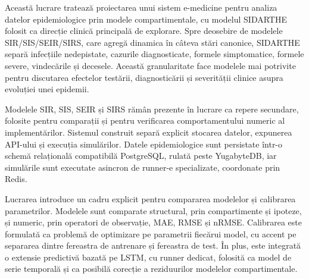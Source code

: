 
Această lucrare tratează proiectarea unui sistem e-medicine pentru analiza datelor
epidemiologice prin modele compartimentale, cu modelul SIDARTHE folosit ca
direcție clinică principală de explorare. Spre deosebire de modelele
SIR/SIS/SEIR/SIRS, care agregă dinamica în câteva stări canonice, SIDARTHE separă
infecțiile nedepistate, cazurile diagnosticate, formele simptomatice, formele
severe, vindecările și decesele.
Această granularitate face modelele mai potrivite pentru discutarea efectelor
testării, diagnosticării și severității clinice asupra evoluției unei epidemii.

Modelele SIR, SIS, SEIR și SIRS rămân prezente în lucrare ca repere
secundare, folosite pentru comparații și pentru verificarea comportamentului
numeric al implementărilor. Sistemul construit separă explicit stocarea datelor,
expunerea API-ului și execuția simulărilor.
Datele epidemiologice sunt persistate într-o schemă relațională compatibilă
PostgreSQL, rulată peste YugabyteDB, iar simulările sunt executate asincron de
runner-e specializate, coordonate prin Redis.

Lucrarea introduce un cadru explicit pentru compararea modelelor și calibrarea
parametrilor. Modelele sunt comparate structural, prin compartimente și ipoteze,
și numeric, prin operatori de observație, MAE, RMSE și nRMSE. Calibrarea este
formulată ca problemă de optimizare pe parametrii fiecărui model, cu accent pe
separarea dintre fereastra de antrenare și fereastra de test. În plus, este
integrată o extensie predictivă bazată pe LSTM, cu runner dedicat, folosită ca
model de serie temporală și ca posibilă corecție a reziduurilor modelelor
compartimentale.

